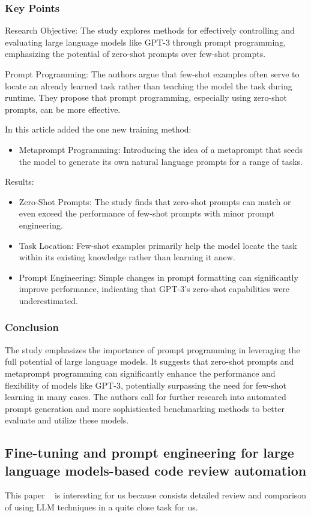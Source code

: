 \documentclass[11pt]{article}
\begin{document}
\subsubsection{Key Points}
Research Objective: The study explores methods for effectively controlling and evaluating large language models like GPT-3 through prompt programming, emphasizing the potential of zero-shot prompts over few-shot prompts.

Prompt Programming: The authors argue that few-shot examples often serve to locate an already learned task rather than teaching the model the task during runtime. They propose that prompt programming, especially using zero-shot prompts, can be more effective.

In this article added the one new training method: 
\begin{itemize}
    \item Metaprompt Programming: Introducing the idea of a metaprompt that seeds the model to generate its own natural language prompts for a range of tasks.
\end{itemize}
Results:
\begin{itemize}
    \item Zero-Shot Prompts: The study finds that zero-shot prompts can match or even exceed the performance of few-shot prompts with minor prompt engineering.
    \item Task Location: Few-shot examples primarily help the model locate the task within its existing knowledge rather than learning it anew.
    \item Prompt Engineering: Simple changes in prompt formatting can significantly improve performance, indicating that GPT-3’s zero-shot capabilities were underestimated.
\end{itemize}
\subsubsection{Conclusion}
The study emphasizes the importance of prompt programming in leveraging the full potential of large language models. It suggests that zero-shot prompts and metaprompt programming can significantly enhance the performance and flexibility of models like GPT-3, potentially surpassing the need for few-shot learning in many cases. The authors call for further research into automated prompt generation and more sophisticated benchmarking methods to better evaluate and utilize these models.

\subsection{Fine-tuning and prompt engineering for large language models-based code review automation}
This paper ~\cite{FTaPE:2024} is interesting for us because consists detailed review and comparison of using LLM techniques in a quite close task for us. 
\end{document}
